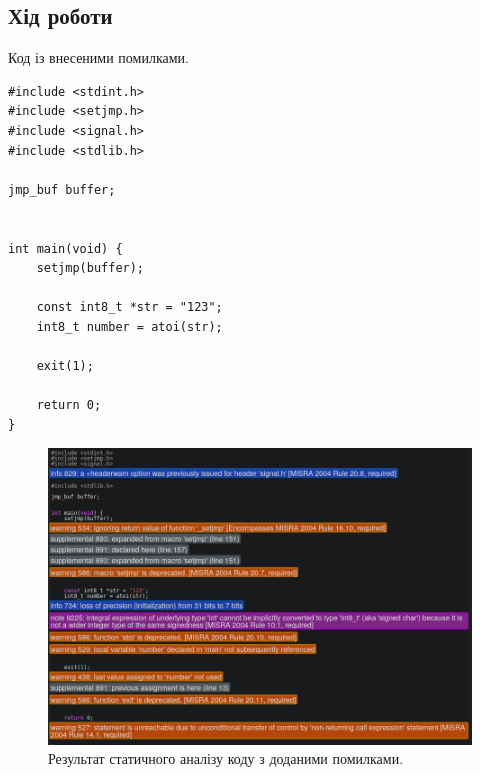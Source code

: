 \documentclass[oneside,14pt]{extarticle}
\begin{document}
\begin{normalsize}
	\section*{Хід роботи}
	
\begin{table}[H]
  \centering
  \caption{Звіт про порушення правил MISRA-C: 2004, знайдені шляхом перегляду коду}
  \label{tab:my-table}
  \renewcommand{\arraystretch}{1.5}
\end{table}

Код із внесеними помилками.

\begin{lstlisting}
#include <stdint.h>
#include <setjmp.h>
#include <signal.h>
#include <stdlib.h>

jmp_buf buffer;


int main(void) {
    setjmp(buffer);
    
	const int8_t *str = "123";
    int8_t number = atoi(str);
    
    exit(1);

    return 0;
}
\end{lstlisting}
	
	\begin{figure}[H]
	    \centering
	    \includegraphics[scale=0.45]{1}
	    \caption{Результат статичного аналізу коду з доданими помилками.}
	\end{figure}
	

\end{normalsize}
\end{document}
